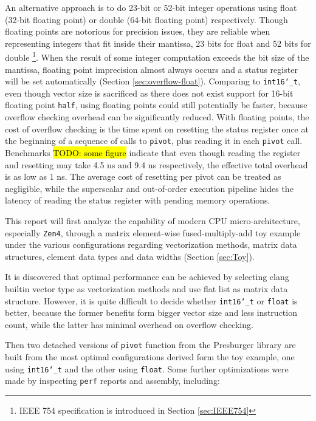 \documentclass[logo,bsc,singlespacing,parskip]{infthesis}
\newcommand{\dtshort}{\texttt{int16\char`_t}}
\newcommand{\dtfloat}{\texttt{float}}
\newcommand{\pivot}{\texttt{pivot}}
\begin{document}
An alternative approach is to do 23-bit or 52-bit integer operations using float
(32-bit floating point) or double (64-bit floating point) respectively. Though
floating points are notorious for precision issues, they are reliable when
representing integers that fit inside their mantissa, 23 bits for float and 52
bits for double \footnote{ IEEE 754 specification is introduced in Section
\ref{sec:IEEE754}}. When the result of some integer computation exceeds the bit
size of the mantissa, floating point imprecision almost always occurs and a
status register will be set automatically (Section \ref{sec:overflow-float}).
Comparing to \dtshort{}, even though vector size is sacrificed as there does not
exist support for 16-bit floating point \texttt{half}, using floating points
could still potentially be faster, because overflow checking overhead can be
significantly reduced. With floating points, the cost of overflow checking is
the time spent on resetting the status register once at the beginning of a
sequence of calls to \pivot{}, plus reading it in each \pivot{} call. Benchmarks
\hl{TODO: some figure} indicate that even though reading the register and
resetting may take 4.5 ns and 9.4 ns respectively, the effective total overhead
is as low as 1 ns. The average cost of resetting per pivot can be treated as
negligible, while the superscalar and out-of-order execution pipeline hides the
latency of reading the status register with pending memory operations.

This report will first analyze the capability of modern CPU micro-architecture,
especially \texttt{Zen4}, through a matrix element-wise fused-multiply-add toy
example under the various configurations regarding vectorization methods, matrix
data structures, element data types and data widths (Section \ref{sec:Toy}). 

It is discovered that optimal performance can be achieved by selecting clang
builtin vector type as vectorization methods and use flat list as matrix data
structure. However, it is quite difficult to decide whether \dtshort{} or
\dtfloat{} is better, because the former benefits form bigger vector size
and less instruction count, while the latter has minimal overhead on overflow
checking. 

Then two detached versions of \texttt{pivot} function from the Presburger
library are built from the most optimal configurations derived form the toy
example, one using \dtshort{} and the other using \dtfloat{}. Some
further optimizations were made by inspecting \texttt{perf} reports and
assembly, including: 
\end{document}
